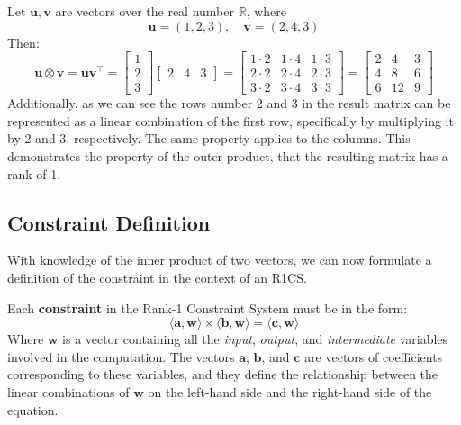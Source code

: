\documentclass[../lecture-notes.tex]{subfiles}
\begin{document}
\begin{example}
    Let $\mathbf{u}, \mathbf{v}$ are vectors over the real number $\mathbb{R}$, where
    \begin{equation*}
        \mathbf{u} = (1, 2, 3), \quad \mathbf{v} = (2, 4, 3)
    \end{equation*}
    Then: 
    \begin{equation*}
        \mathbf{u} \otimes \mathbf{v} = \mathbf{u}\mathbf{v}^{\top} = \begin{bmatrix}
        1 \\ 2 \\ 3
        \end{bmatrix}\begin{bmatrix}
        2 & 4 & 3
        \end{bmatrix} = \begin{bmatrix}
            1 \cdot 2 & 1 \cdot 4 & 1 \cdot 3 \\
            2 \cdot 2 & 2 \cdot 4 & 2 \cdot 3 \\
            3 \cdot 2 & 3 \cdot 4 & 3 \cdot 3
        \end{bmatrix} = \begin{bmatrix}
            2 & 4 & 3 \\
            4 & 8 & 6 \\
            6 & 12 & 9
        \end{bmatrix}
    \end{equation*}
    Additionally, as we can see the rows number 2 and 3 in the result matrix can be represented
    as a linear combination of the first row, specifically by multiplying it by 2 and 3, 
    respectively. The same property applies to the columns. This demonstrates the property of the
    outer product, that the resulting matrix has a rank of 1.
\end{example}

\subsection{Constraint Definition}
With knowledge of the inner product of two vectors, we can now formulate a definition of the 
constraint in the context of an R1CS.

\begin{definition}
    Each \textbf{constraint} in the Rank-1 Constraint System must be in the form:
    \begin{equation*}
        \langle \mathbf{a}, \mathbf{w}\rangle \times \langle \mathbf{b}, \mathbf{w}\rangle = \langle \mathbf{c}, \mathbf{w}\rangle
    \end{equation*}
    Where $\mathbf{w}$ is a vector containing all the \textit{input}, \textit{output}, and 
    \textit{intermediate} variables involved in the computation. The vectors $\mathbf{a}$, 
    $\mathbf{b}$, and $\mathbf{c}$ are vectors of coefficients corresponding to these variables, 
    and they define the relationship between the linear combinations of $\mathbf{w}$ on the 
    left-hand side and the right-hand side of the equation.
\end{definition}
\end{document}
